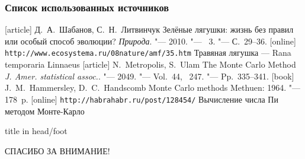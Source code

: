﻿\documentclass[pdf, intlimits, unicode, S6, presentation]{beamer}
\newcounter{sli}
\newcommand{\slnumber}{\hfill {\color{lightgray} \refstepcounter{sli}\arabic{sli}}}
\begin{document}
\begin{frame}
    \frametitle{Список использованных источников  \slnumber}
    \small
    \begin{thebibliography}{9}
        [article]
            Д.~А.~Шабанов, С.~Н.~Литвинчук
    		\newblock
    		Зелёные лягушки: жизнь без правил или особый способ эволюции?
      		\newblock\emph{Природа}. "---
    		2010. "--- 
    		\No~3. "---
    		С.~29--36.
        [online]
            \verb"http://www.ecosystema.ru/08nature/amf/35.htm"
            \newblock Травяная лягушка — Rana temporaria Linnaeus
        [article]
            N.~Metropolis, S.~Ulam
            \newblock The Monte Carlo Method
            \newblock \emph{J. Amer. statistical assoc.}. "---
            2049. "--- 
            Vol.~44, \No~247. "---
            Pp.~335--341.
        [book]
            J.~M.~Hammersley, D.~C.~Handscomb
            \newblock Monte Carlo methods
            \newblock Methuen: 1964. "---
            178~p.
        [online]
            \verb"http://habrahabr.ru/post/128454/"
            \newblock Вычисление числа Пи методом Монте-Карло
    \end{thebibliography}
\end{frame}



\begin{frame}
	\begin{beamercolorbox}[ht=7ex, dp=4ex, center, shadow=true, rounded=true]{title in head/foot}
	\centerline{\LARGE{СПАСИБО ЗА ВНИМАНИЕ!}}
	\end{beamercolorbox}
\end{frame}
\end{document}

